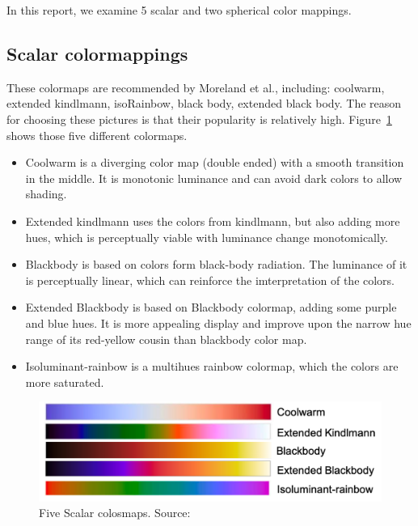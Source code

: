 \documentclass[a4paper, 12pt]{report}
\begin{document}
In this report, we examine 5 scalar and two spherical color mappings. 

\subsection*{Scalar colormappings}

These colormaps are recommended by Moreland et al., including: coolwarm, extended kindlmann, isoRainbow, black body, extended black body. The reason for choosing these pictures is that their popularity is relatively high. Figure~\ref{fig:1} shows those five different colormaps.

\begin{itemize}
	\item Coolwarm is a diverging color map (double ended) with a smooth transition in the middle. It is monotonic luminance and can avoid dark colors to allow shading. 

	\item Extended kindlmann uses the colors from kindlmann, but also adding more hues, which is perceptually viable with luminance change monotomically. 

	\item Blackbody is based on colors form black-body radiation. The luminance of it is perceptually linear, which can reinforce the imterpretation of the colors.

	\item Extended Blackbody is based on Blackbody colormap, adding some purple and blue hues. It is more appealing display and improve upon the narrow hue range of its red-yellow cousin than blackbody color map. 

	\item Isoluminant-rainbow is a multihues rainbow colormap, which the colors are more saturated.
\end{itemize}
\begin{figure}[ht]
    \centering
    \includegraphics[width = 0.8\columnwidth]{1}
    \caption{ Five Scalar colosmaps. Source:  \cite{???}}
    \label{fig:1}
\end{figure}	
\end{document}
